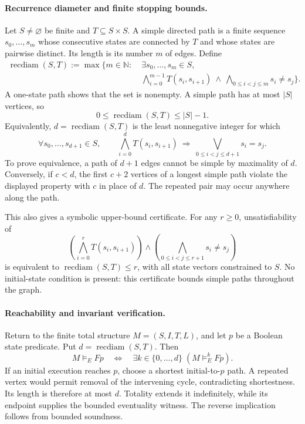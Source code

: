 \paragraph{Recurrence diameter and finite stopping bounds.}
Let \(S\ne\varnothing\) be finite and \(T\subseteq S\times S\).
A simple directed path is a finite sequence \(s_0,\ldots,s_m\) whose
consecutive states are connected by \(T\) and whose states are pairwise
distinct. Its length is its number \(m\) of edges. Define
\[
\begin{split}
 \operatorname{recdiam}(S,T)
 :=\max\{m\in\mathbb N:\;&
   \exists s_0,\ldots,s_m\in S,\\
 &\bigwedge_{i=0}^{m-1}T(s_i,s_{i+1})
   \ \land\
   \bigwedge_{0\leq i<j\leq m}s_i\ne s_j\}.
\end{split}
\]
A one-state path shows that the set is nonempty. A simple path has at most
\(|S|\) vertices, so
\[
 0\leq\operatorname{recdiam}(S,T)\leq |S|-1.
\]
Equivalently, \(d=\operatorname{recdiam}(S,T)\) is the least nonnegative
integer for which
\[
 \forall s_0,\ldots,s_{d+1}\in S,\qquad
 \bigwedge_{i=0}^{d}T(s_i,s_{i+1})
 \ \Longrightarrow\
 \bigvee_{0\leq i<j\leq d+1}s_i=s_j.
\]
To prove equivalence, a path of \(d+1\) edges cannot be simple by maximality
of \(d\). Conversely, if \(c<d\), the first \(c+2\) vertices of a longest
simple path violate the displayed property with \(c\) in place of \(d\).
The repeated pair may occur anywhere along the path.

This also gives a symbolic upper-bound certificate. For any \(r\geq0\),
unsatisfiability of
\[
 \left(\bigwedge_{i=0}^{r}T(s_i,s_{i+1})\right)
 \land
 \left(\bigwedge_{0\leq i<j\leq r+1}s_i\ne s_j\right)
\]
is equivalent to \(\operatorname{recdiam}(S,T)\leq r\), with all state
vectors constrained to \(S\). No initial-state condition is present:
this certificate bounds simple paths throughout the graph.

\paragraph{Reachability and invariant verification.}
Return to the finite total structure \(M=(S,I,T,L)\), and let \(p\) be a
Boolean state predicate. Put \(d=\operatorname{recdiam}(S,T)\). Then
\[
 M\models_E Fp
 \quad\Longleftrightarrow\quad
 \exists k\in\{0,\ldots,d\}\;(M\models_E^k Fp).
\]
If an initial execution reaches \(p\), choose a shortest initial-to-\(p\)
path. A repeated vertex would permit removal of the intervening cycle,
contradicting shortestness. Its length is therefore at most \(d\).
Totality extends it indefinitely, while its endpoint supplies the bounded
eventuality witness. The reverse implication follows from bounded soundness.

